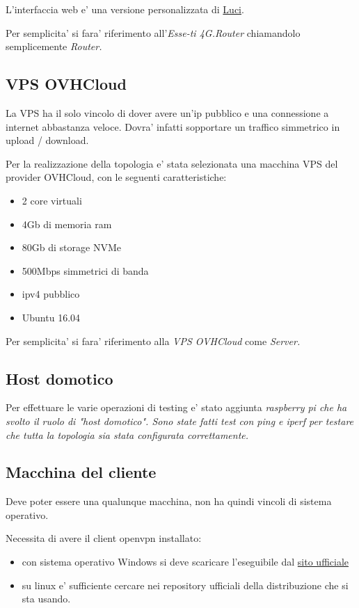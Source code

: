 \begin{figure}[H]
\end{figure}

L'interfaccia web e' una versione personalizzata di \href{https://openwrt.org/docs/guide-user/luci/start}{Luci}.

Per semplicita' si fara' riferimento all'\textit{Esse-ti 4G.Router} chiamandolo semplicemente \it{Router}.

\subsection{VPS OVHCloud}

La VPS ha il solo vincolo di dover avere un'ip pubblico e una connessione a internet abbastanza veloce. Dovra' infatti sopportare un traffico simmetrico in upload / download.

Per la realizzazione della topologia e' stata selezionata una macchina VPS del provider OVHCloud, con le seguenti caratteristiche:

\begin{itemize}
	\item 2 core virtuali
	\item 4Gb di memoria ram
	\item 80Gb di storage NVMe
	\item 500Mbps simmetrici di banda
	\item ipv4 pubblico
	\item Ubuntu 16.04
\end{itemize}

Per semplicita' si fara' riferimento alla \textit{VPS OVHCloud} come \it{Server}.

\subsection{Host domotico}

Per effettuare le varie operazioni di testing e' stato aggiunta \it{raspberry pi} che ha svolto il ruolo di "host domotico". Sono state fatti test con ping e iperf per testare che tutta la topologia sia stata configurata correttamente.


\subsection{Macchina del cliente}

Deve poter essere una qualunque macchina, non ha quindi vincoli di sistema operativo.

Necessita di avere il client openvpn installato:

\begin{itemize}
	\item con sistema operativo Windows si deve scaricare l'eseguibile dal \href{https://openvpn.net/client-connect-vpn-for-windows/}{sito ufficiale}
	\item su linux e' sufficiente cercare nei repository ufficiali della distribuzione che si sta usando.
\end{itemize}


